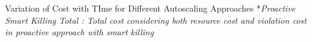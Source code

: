 Variation of Cost with TIme for Different Autoscaling Approaches
*\textit{Proactive Smart Killing Total : Total cost considering both resource cost and violation cost in proactive approach with smart killing}